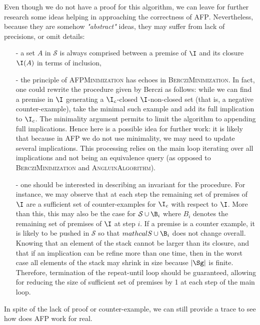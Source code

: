 Even though we do not have a proof for this algorithm, we can leave for further
research some ideas helping in approaching the correctness of \textsc{AFP}. Nevertheless, because they are somehow \textit{"abstract"} ideas, they may suffer from lack of precisions, or omit details:
\begin{itemize}
	\item[-] a set $A$ in $\mathcal{S}$ is always comprised between a premise
	of $\I$ and its closure $\I(A)$ in terms of inclusion,
	\item[-] the principle of \textsc{AFPMinimization} has echoes in \textsc{BercziMinimization}. In fact, one could rewrite the procedure 
	given by Berczi as follows: while we can find a premise in $\I$ generating a $\I_c$-closed $\I$-non-closed set (that is, a negative counter-example),
	take the minimal such example and add its full implication to $\I_c$. The minimality argument permits to limit the algorithm to appending full implications. Hence here is a possible idea for further work: it is likely that because in \textsc{AFP} we do not use minimality, we may need to update several implications. This processing relies on the main loop iterating over all implications and not being an equivalence query (as opposed to \textsc{BercziMinimization} and \textsc{AngluinAlgorithm}).
	\item[-] one should be interested in describing an invariant for the
	procedure. For instance, we may observe that at each step the remaining
	set of premises of $\I$ are a sufficient set of counter-examples for $\I_c$ with respect to $\I$. More than this, this may also be the case for $\mathcal{S} \cup \B_i$ where $B_i$ denotes the remaining set of premises of $\I$ at step $i$. If a premise is a counter example, it is likely to
	be pushed in $\mathcal{S}$ so that $mathcal{S} \cup \B_i$ does not change
	overall. Knowing that an element of the stack cannot be larger than its closure, and that if an implication can be refine more than one time, then 
	in the worst case all elements of the stack may shrink in size because $|\Sg|$ is finite. Therefore, termination of the repeat-until loop should be guaranteed, allowing for reducing the size of sufficient set of premises by 1 at each step of the main loop.
\end{itemize}
\noindent In spite of the lack of proof or counter-example, we can still provide a trace to see how does \textsc{AFP} work for real.

